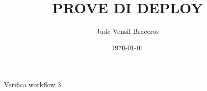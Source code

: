 \documentclass{article}
\title{PROVE DI DEPLOY}
\author{Jude Vensil Braceros}
\date{\today}
\begin{document}
\maketitle

Verifica workflow 3
\end{document}
